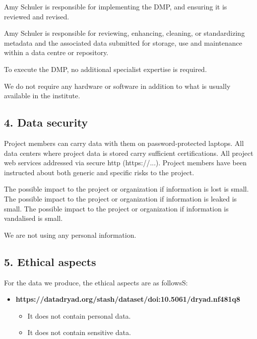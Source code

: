 \documentclass[
  english,
]{article}
\providecommand{\tightlist}{%
  \setlength{\itemsep}{0pt}\setlength{\parskip}{0pt}}
\begin{document}
Amy Schuler is responsible for implementing the DMP, and ensuring it is
reviewed and revised.

Amy Schuler is responsible for reviewing, enhancing, cleaning, or
standardizing metadata and the associated data submitted for storage,
use and maintenance within a data centre or repository.

To execute the DMP, no additional specialist expertise is required.

We do not require any hardware or software in addition to what is
usually available in the institute.

\hypertarget{sec-data-security}{}
\hypertarget{data-security}{%
\subsection{4. Data security}\label{data-security}}

\hypertarget{q-data-security}{}
Project members can carry data with them on password-protected laptops.
All data centers where project data is stored carry sufficient
certifications. All project web services addressed via secure http
(https://...). Project members have been instructed about both generic
and specific risks to the project.

The possible impact to the project or organization if information is
lost is small. The possible impact to the project or organization if
information is leaked is small. The possible impact to the project or
organization if information is vandalised is small.

We are not using any personal information.

\hypertarget{sec-ethical-aspects}{}
\hypertarget{ethical-aspects}{%
\subsection{5. Ethical aspects}\label{ethical-aspects}}

\hypertarget{q-ethical-aspects}{}
For the data we produce, the ethical aspects are as followsS:

\begin{itemize}
\tightlist
\item
  \textbf{https://datadryad.org/stash/dataset/doi:10.5061/dryad.nf481q8}

  \begin{itemize}
  \tightlist
  \item
    It does not contain personal data.
  \item
    It does not contain sensitive data.
  \end{itemize}
\end{itemize}
\end{document}
